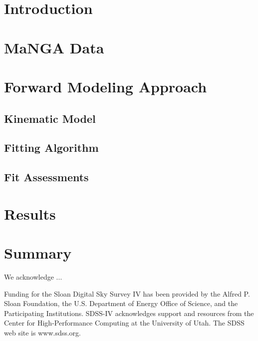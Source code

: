 \section{Introduction}
\label{sec:intro}

\section{MaNGA Data}
\label{sec:data}

\section{Forward Modeling Approach}
\label{sec:modeling}

\subsection{Kinematic Model}

\subsection{Fitting Algorithm}

\subsection{Fit Assessments}

\section{Results}

\section{Summary}



\acknowledgements

We acknowledge ...

Funding for the Sloan Digital Sky Survey IV has been provided by the
Alfred P. Sloan Foundation, the U.S. Department of Energy Office of
Science, and the Participating Institutions. SDSS-IV acknowledges
support and resources from the Center for High-Performance Computing at
the University of Utah. The SDSS web site is www.sdss.org.

